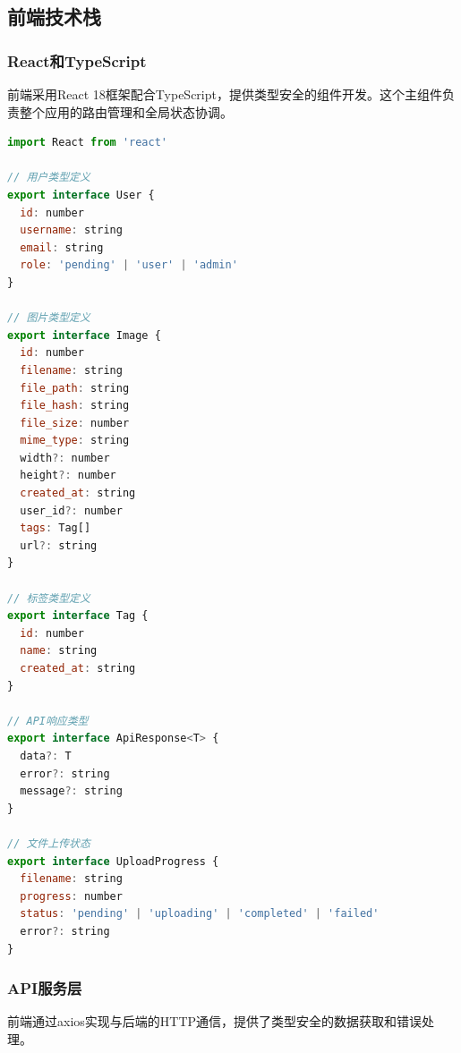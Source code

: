 \documentclass[cs4size,a4paper]{ctexart}
\numberwithin{equation}{section}
\numberwithin{table}{section}
\numberwithin{figure}{section}
\begin{document}
\subsection{前端技术栈}

\subsubsection{React和TypeScript}

前端采用React 18框架配合TypeScript，提供类型安全的组件开发。这个主组件负责整个应用的路由管理和全局状态协调。

\begin{lstlisting}[language=JavaScript,caption=TypeScript类型定义]
import React from 'react'

// 用户类型定义
export interface User {
  id: number
  username: string
  email: string
  role: 'pending' | 'user' | 'admin'
}

// 图片类型定义
export interface Image {
  id: number
  filename: string
  file_path: string
  file_hash: string
  file_size: number
  mime_type: string
  width?: number
  height?: number
  created_at: string
  user_id?: number
  tags: Tag[]
  url?: string
}

// 标签类型定义
export interface Tag {
  id: number
  name: string
  created_at: string
}

// API响应类型
export interface ApiResponse<T> {
  data?: T
  error?: string
  message?: string
}

// 文件上传状态
export interface UploadProgress {
  filename: string
  progress: number
  status: 'pending' | 'uploading' | 'completed' | 'failed'
  error?: string
}
\end{lstlisting}

\subsubsection{API服务层}

前端通过axios实现与后端的HTTP通信，提供了类型安全的数据获取和错误处理。
\end{document}
